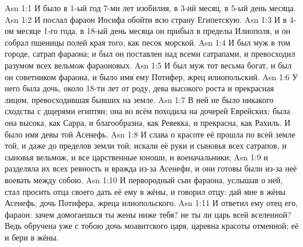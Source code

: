 \vs Asn 1:1
И было в 1-ый год 7-ми лет изобилия, в 3-ий месяц, в 5-ый день месяца.
\vs Asn 1:2
И послал фараон Иосифа обойти всю страну Египетскую.
\vs Asn 1:3
И в 4-ом месяце 1-го года, в 18-ый день месяца
он прибыл в пределы Илиополя, и он собрал
пшеницы полей края того, как песок морской.
\vs Asn 1:4
И был муж в том городе, сатрап фараона;
и был он поставлен над всеми сатрапами, и превосходил разумом
всех вельмож фараоновых.
\vs Asn 1:5
И был муж тот весьма богат,
и был он советником фараона,
и было имя ему Потифер, жрец илиопольский.
\vs Asn 1:6
У него была дочь, около
18-ти лет от роду, дева высокого роста и прекрасная лицом,
превосходившая бывших на земле.
\vs Asn 1:7
В ней не было никакого
сходства с дщерями египтян; она во всём походила на дочерей Еврейских:
была она высока, как Сарра, и благообразна,
как Ревекка, и прекрасна, как Рахиль.
И было имя девы той Асенефь.
\vs Asn 1:8
И слава о красоте её прошла по всей земле той,
и даже до пределов земли той; искали её руки и сыновья всех
сатрапов, и сыновья вельмож, и все царственные юноши, и военачальники;
\vs Asn 1:9
и разделяла их всех ревность и вражда из-за Асенефи,
и они готовы были из-за неё воевать между собою.
\vs Asn 1:10
И первородный сын фараона,
услышав о ней, стал просить отца своего дать её ему в жёны,
и говорил отцу:
дай мне в жёны Асенефь, дочь Потифера, жреца илиопольского.
\vs Asn 1:11
И ответил ему отец его, фараон:
зачем домогаешься ты жены ниже тебя?
не ты ли царь всей вселенной?
Ведь обручена уже с тобою дочь моавитского царя,
царевна красоты отменной; её и бери в жёны.

